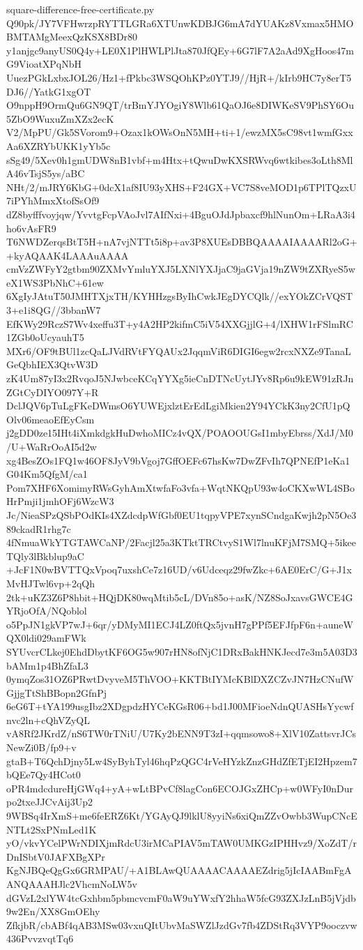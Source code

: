 \documentclass[11pt]{article}
\theoremstyle{definition}
\theoremstyle{remark}
\begin{document}
\begin{filecontents*}[overwrite]{square-difference-free-certificate.py}
Q90pk/JY7VFHwrzpRYTTLGRa6XTUnwKDBJG6mA7dYUAKz8Vxmax5HMOBMTAMgMeexQzKSX8BDr80
y1anjgc9anyUS0Q4y+LE0X1PlHWLPlJta870JfQEy+6G7lF7A2aAd9XgHoos47mG9VioatXPqNbH
UuezPGkLxbxJOL26/Hz1+fPkbc3WSQOhKPz0YTJ9//HjR+/kIrb9HC7y8erT5DJ6//YatkG1xgOT
O9nppH9OrmQu6GN9QT/trBmYJYOgiY8Wlb61QaOJ6e8DIWKeSV9PhSY6Ou5ZbO9WuxuZmXZx2ecK
V2/MpPU/Gk5SVorom9+Ozax1kOWsOnN5MH+ti+1/ewzMX5sC98vt1wmfGxxAa6XZRYbUKK1yYb5c
sSg49/5Xev0h1gmUDW8nB1vbf+m4Htx+tQwuDwKXSRWvq6wtkibes3oLth8MlA46vTsjS5ys/aBC
NHt/2/mJRY6KbG+0dcX1af8IU93yXHS+F24GX+VC7S8veMOD1p6TPlTQzxU7iPYhMmxXtofSsOf9
dZ8byfffvoyjqw/YvvtgFcpVAoJvl7AIfNxi+4BguOJdJpbaxcf9hlNunOm+LRaA3i4ho6vAsFR9
T6NWDZerqsBtT5H+nA7vjNTTt5i8p+av3P8XUEsDBBQAAAAIAAAARl2oG++kyAQAAK4LAAAuAAAA
cmVzZWFyY2gtbm90ZXMvYmluYXJ5LXNlYXJjaC9jaGVja19nZW9tZXRyeS5weX1WS3PbNhC+61ew
6XgIyJAtuT50JMHTXjxTH/KYHHzgsByIhCwkJEgDYCQlk//exYOkZCrVQST3+e1i8QG//3bbanW7
EfKWy29RczS7Wv4xeffu3T+y4A2HP2kifmC5iV54XXGjjlG+4/lXHW1rFSlmRC1ZGb0oUcyauhT5
MXr6/OF9tBUl1zcQaLJVdRVtFYQAUx2JqqmViR6DIGI6egw2rcxNXZe9TanaLGeQbhIEX3QtvW3D
zK4Um87yI3x2RvqoJ5NJwbceKCqYYXg5ieCnDTNcUytJYv8Rp6u9kEW91zRJnZGtCyDIYO097Y+R
DclJQV6pTuLgFKeDWmsO6YUWEjxlztErEdLgiMkien2Y94YCkK3ny2CfU1pQOlv06meaoEfEyCsm
j2gDD0ze15IHt4iXmkdgkHuDwhoMICz4vQX/POAOOUGsI1mbyEbrss/XdJ/M0/U+WaRrOoAI5d2w
xg4BesZOs1FQ1w46OF8JyV9bVgoj7GffOEFc67hsKw7DwZFvIh7QPNEfP1eKa1G04Km5QfgM/ca1
Pom7XHF6XomimyRWsGyhAmXtwfaFo3vfa+WqtNKQpU93w4oCKXwWL4SBoHrPmji1jmhOFj6WzcW3
Jc/NieaSPzQSbPOdKIs4XZdcdpWfGbf0EU1tqpyVPE7xynSCndgaKwjh2pN5Oe389ckadR1rhg7c
4fNmuaWkYTGTAWCaNP/2Facjl25a3KTktTRCtvyS1Wl7lnuKFjM7SMQ+5ikeeTQly3lBkblup9aC
+JcF1N0wBVTTQxVpoq7uxshCe7z16UD/v6Udceqz29fwZkc+6AE0ErC/G+J1xMvHJTwl6vp+2qQh
2tk+uKZ3Z6P8hbit+HQjDK80wqMtib5cL/DVn85o+asK/NZ8SoJxavsGWCE4GYRjoOfA/NQoblol
o5PpJN1gkVP7wJ+6qr/yDMyMI1ECJ4LZ0ftQx5jvnH7gPPf5EFJfpF6n+auneWQX0ldi029amFWk
SYUvcrCLkej0EhdDbytKF6OG5w907rHN8ofNjC1DRxBakHNKJecd7e3m5A03D3bAMm1p4BhZfaL3
0ymqZos31OZ6PRwtDvyveM5ThVOO+KKTBtIYMcKBlDXZCZvJN7HzCNufWGjjgTtShBBopn2GfnPj
6eG6T+tYA199usgIbz2XDgpdzHYCeKGsR06+bd1J00MFioeNdnQUASHsYycwfnvc2ln+cQhVZyQL
vA8Rf2JKrdZ/nS6TW0rTNiU/U7Ky2bENN9T3zI+qqmsowo8+XlV10ZattsvrJCsNewZi0B/fp9+v
gtaB+T6QchDjny5Lw4SyByhTyl46hqPzQGC4rVeHYzkZnzGHdZfETjEI2Hpzem7bQEe7Qy4HCot0
oPR4mdcdureHjGWq4+yA+wLtBPvCf8lagCon6ECOJGxZHCp+w0WFyI0nDurpo2txeJJCvAij3Up2
9WBSq4IrXmS+me6feERZ6Kt/YGAyQJ9lklU8yyiNs6xiQmZZvOwbb3WupCNcENTLt2SxPNmLed1K
yO/vkvYCelPWrNDIXjmRdcU3irMCaPIAV5mTAW0UMKGzIPHHvz9/XoZdT/rDnISbtV0JAFXBgXPr
KgNJBQeQgGx6GRMPAU/+A1BLAwQUAAAACAAAAEZdrig5jIcIAABmFgAANQAAAHJlc2VhcmNoLW5v
dGVzL2xlYW4tcGxhbm5pbmcvcmF0aW9uYWxfY2hhaW5fcG93ZXJzLnB5jVjdb9w2En/XX8GmOEhy
ZfkjbR/cbABf4qAB3MSw03vxuQItUbvMaSWZlJzdGv7fb4ZDStRq3VYP9ooczvw436PvvzvqtTq6

\end{filecontents*}
\end{document}
